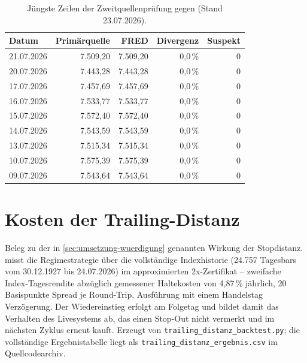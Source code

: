 \begin{table}[htbp]
  \centering
  \caption[Zweitquellenprüfung der Tagesschlusskurse]{Jüngste Zeilen der
    Zweitquellenprüfung gegen 
    (Stand 23.07.2026).\quelleeigen}
  \label{tab:anhang-crosscheck}
  \begin{tabular}{l r r r r}
    \hline
    Datum & Primärquelle & FRED & Divergenz & Suspekt \\
    \hline
    21.07.2026 & 7.509{,}20 & 7.509{,}20 & 0{,}0\,\% & 0 \\
    20.07.2026 & 7.443{,}28 & 7.443{,}28 & 0{,}0\,\% & 0 \\
    17.07.2026 & 7.457{,}69 & 7.457{,}69 & 0{,}0\,\% & 0 \\
    16.07.2026 & 7.533{,}77 & 7.533{,}77 & 0{,}0\,\% & 0 \\
    15.07.2026 & 7.572{,}40 & 7.572{,}40 & 0{,}0\,\% & 0 \\
    14.07.2026 & 7.543{,}59 & 7.543{,}59 & 0{,}0\,\% & 0 \\
    13.07.2026 & 7.515{,}34 & 7.515{,}34 & 0{,}0\,\% & 0 \\
    10.07.2026 & 7.575{,}39 & 7.575{,}39 & 0{,}0\,\% & 0 \\
    09.07.2026 & 7.543{,}64 & 7.543{,}64 & 0{,}0\,\% & 0 \\
    \hline
  \end{tabular}
\end{table}

\section{Kosten der Trailing-Distanz}
\label{sec:anhang-trailing-distanz}

Beleg zu der in \cref{sec:umsetzung-wuerdigung} genannten Wirkung der
Stopdistanz.  misst die Regimestrategie über
die vollständige Indexhistorie (24.757 Tagesbars vom 30.12.1927 bis 24.07.2026) im
approximierten 2x-Zertifikat -- zweifache Index-Tagesrendite abzüglich
gemessener Haltekosten von 4{,}87\,\% jährlich, 20 Basispunkte Spread je
Round-Trip, Ausführung mit einem Handelstag Verzögerung. Der Wiedereinstieg
erfolgt am Folgetag und bildet damit das Verhalten des Livesystems ab, das
einen Stop-Out nicht vermerkt und im nächsten Zyklus erneut kauft. Erzeugt von
\texttt{trailing\_distanz\_backtest.py}; die vollständige Ergebnistabelle liegt
als \texttt{trailing\_distanz\_ergebnis.csv} im Quellcodearchiv.



